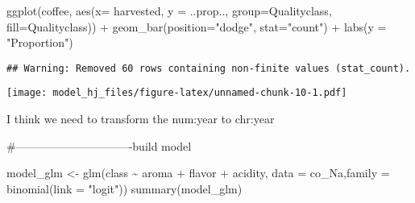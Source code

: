 \documentclass[
]{article}
\newenvironment{Shaded}{\begin{snugshade}}{\end{snugshade}}
\newcommand{\AttributeTok}[1]{\textcolor[rgb]{0.77,0.63,0.00}{#1}}
\newcommand{\FunctionTok}[1]{\textcolor[rgb]{0.00,0.00,0.00}{#1}}
\newcommand{\NormalTok}[1]{#1}
\newcommand{\OtherTok}[1]{\textcolor[rgb]{0.56,0.35,0.01}{#1}}
\newcommand{\SpecialCharTok}[1]{\textcolor[rgb]{0.00,0.00,0.00}{#1}}
\newcommand{\StringTok}[1]{\textcolor[rgb]{0.31,0.60,0.02}{#1}}
\begin{document}
\begin{Shaded}
\begin{Highlighting}[]
\FunctionTok{ggplot}\NormalTok{(coffee, }\FunctionTok{aes}\NormalTok{(}\AttributeTok{x=}\NormalTok{ harvested,  }\AttributeTok{y =}\NormalTok{ ..prop.., }\AttributeTok{group=}\NormalTok{Qualityclass, }\AttributeTok{fill=}\NormalTok{Qualityclass)) }\SpecialCharTok{+} 
    \FunctionTok{geom\_bar}\NormalTok{(}\AttributeTok{position=}\StringTok{"dodge"}\NormalTok{, }\AttributeTok{stat=}\StringTok{"count"}\NormalTok{) }\SpecialCharTok{+}
    \FunctionTok{labs}\NormalTok{(}\AttributeTok{y =} \StringTok{"Proportion"}\NormalTok{)}
\end{Highlighting}
\end{Shaded}

\begin{verbatim}
## Warning: Removed 60 rows containing non-finite values (stat_count).
\end{verbatim}

\texttt{[image: model\_hj\_files/figure-latex/unnamed-chunk-10-1.pdf]}

I think we need to transform the num:year to chr:year

\begin{Shaded}
\end{Shaded}

\#-------------------------------build model

\begin{Shaded}
\begin{Highlighting}[]
\NormalTok{model\_glm }\OtherTok{\textless{}{-}} \FunctionTok{glm}\NormalTok{(class }\SpecialCharTok{\textasciitilde{}}\NormalTok{ aroma }\SpecialCharTok{+}\NormalTok{ flavor }\SpecialCharTok{+}\NormalTok{ acidity, }\AttributeTok{data =}\NormalTok{ co\_Na,}\AttributeTok{family =} \FunctionTok{binomial}\NormalTok{(}\AttributeTok{link =} \StringTok{"logit"}\NormalTok{))}
\FunctionTok{summary}\NormalTok{(model\_glm)}
\end{Highlighting}
\end{Shaded}
\end{document}
